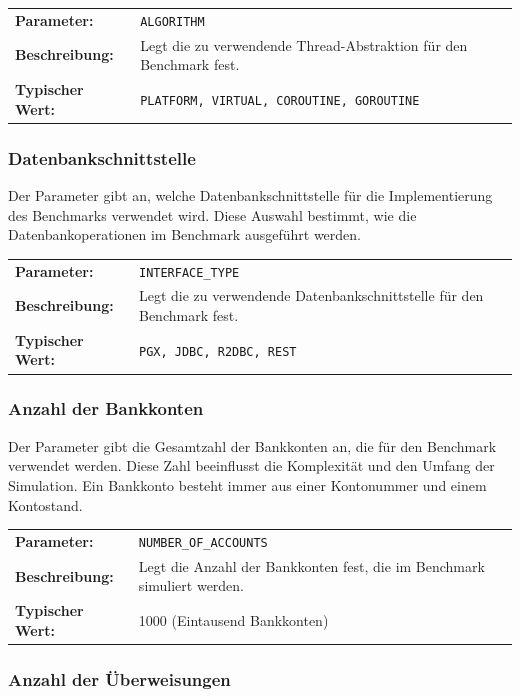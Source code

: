 \documentclass[fontsize=12pt,paper=a4,twoside=semi,parskip=half-,headsepline,headinclude]{scrreprt}
\begin{document}
\begin{tabularx}{\textwidth}{@{}lX@{}}
	\textbf{Parameter:} & \texttt{ALGORITHM} \\
	\textbf{Beschreibung:} & Legt die zu verwendende Thread-Abstraktion für den Benchmark fest. \\
	\textbf{Typischer Wert:} & \texttt{PLATFORM, VIRTUAL, COROUTINE, GOROUTINE}
\end{tabularx}

\subsubsection{Datenbankschnittstelle}

Der Parameter gibt an, welche Datenbankschnittstelle für die Implementierung des Benchmarks verwendet wird. Diese Auswahl bestimmt, wie die Datenbankoperationen im Benchmark ausgeführt werden.

\begin{tabularx}{\textwidth}{@{}lX@{}}
	\textbf{Parameter:} & \texttt{INTERFACE\_TYPE} \\
	\textbf{Beschreibung:} & Legt die zu verwendende Datenbankschnittstelle für den Benchmark fest. \\
	\textbf{Typischer Wert:} & \texttt{PGX, JDBC, R2DBC, REST}
\end{tabularx}

\subsubsection{Anzahl der Bankkonten}

Der Parameter gibt die Gesamtzahl der Bankkonten an, die für den Benchmark verwendet werden. Diese Zahl beeinflusst die Komplexität und den Umfang der Simulation. Ein Bankkonto besteht immer aus einer Kontonummer und einem Kontostand.

\begin{tabularx}{\textwidth}{@{}lX@{}}
	\textbf{Parameter:} & \texttt{NUMBER\_OF\_ACCOUNTS} \\
	\textbf{Beschreibung:} & Legt die Anzahl der Bankkonten fest, die im Benchmark simuliert werden. \\
	\textbf{Typischer Wert:} & 1000 (Eintausend Bankkonten)
\end{tabularx}

\subsubsection{Anzahl der Überweisungen}
\end{document}
